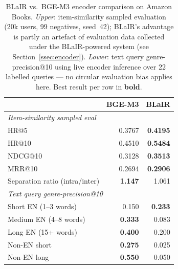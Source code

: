 \begin{table}[H]
\caption{BLaIR vs.\ BGE-M3 encoder comparison on Amazon Books.
  \emph{Upper}: item-similarity sampled evaluation (20k users, 99 negatives,
  seed~42); BLaIR's advantage is partly an artefact of evaluation data
  collected under the BLaIR-powered system (see Section~\ref{ssec:encoder}).
  \emph{Lower}: text query genre-precision@10 using live encoder inference
  over 22 labelled queries — no circular evaluation bias applies here.
  Best result per row in \textbf{bold}.}
\label{tab:encoder_comparison}
\centering
\small
\begin{tabular}{lrr}
\toprule
 & \textbf{BGE-M3} & \textbf{BLaIR} \\
\midrule
\multicolumn{3}{l}{\emph{Item-similarity sampled eval}} \\[2pt]
\quad HR@5      & 0.3767 & \textbf{0.4195} \\
\quad HR@10     & 0.4510 & \textbf{0.5484} \\
\quad NDCG@10   & 0.3128 & \textbf{0.3513} \\
\quad MRR@10    & 0.2694 & \textbf{0.2906} \\
\quad Separation ratio (intra/inter) & \textbf{1.147} & 1.061 \\
\midrule
\multicolumn{3}{l}{\emph{Text query genre-precision@10}} \\[2pt]
\quad Short EN (1--3 words)  & 0.150          & \textbf{0.233} \\
\quad Medium EN (4--8 words) & \textbf{0.333} & 0.083          \\
\quad Long EN (15+ words)    & \textbf{0.400} & 0.200          \\
\quad Non-EN short       & \textbf{0.275} & 0.025          \\
\quad Non-EN long        & \textbf{0.550} & 0.050          \\
\bottomrule
\end{tabular}
\end{table}
